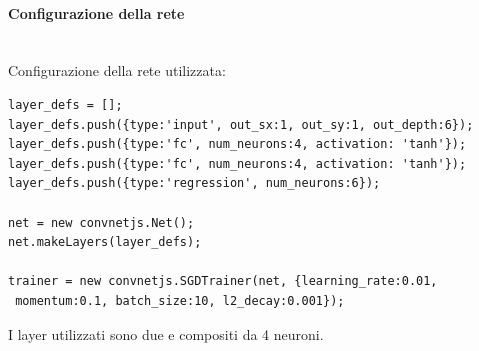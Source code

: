\documentclass[10pt,a4paper]{article}
\begin{document}
\paragraph{Configurazione della rete}\mbox{}
\label{Configurazione della rete 4 neuroni per 2 layers}
\\
Configurazione della rete utilizzata:\\
\begin{verbatim}layer_defs = [];
layer_defs.push({type:'input', out_sx:1, out_sy:1, out_depth:6});
layer_defs.push({type:'fc', num_neurons:4, activation: 'tanh'});
layer_defs.push({type:'fc', num_neurons:4, activation: 'tanh'});
layer_defs.push({type:'regression', num_neurons:6});

net = new convnetjs.Net();
net.makeLayers(layer_defs);

trainer = new convnetjs.SGDTrainer(net, {learning_rate:0.01,
 momentum:0.1, batch_size:10, l2_decay:0.001});
\end{verbatim}
\noindent
I layer utilizzati sono due e compositi da 4 neuroni.
\end{document}
